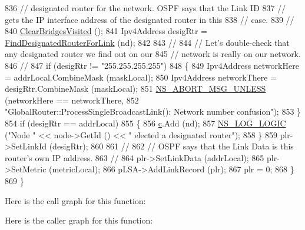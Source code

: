 \begin{DoxyCode}
836       \textcolor{comment}{// designated router for the network.  OSPF says that the Link ID}
837       \textcolor{comment}{// gets the IP interface address of the designated router in this }
838       \textcolor{comment}{// case.}
839       \textcolor{comment}{//}
840       \hyperlink{classns3_1_1GlobalRouter_a2519d9ebeb7425ffe4569c6ed0eaf4cf}{ClearBridgesVisited} ();
841       Ipv4Address desigRtr = \hyperlink{classns3_1_1GlobalRouter_ab562e4407394674ef8502b3ab1d051d6}{FindDesignatedRouterForLink} (nd);
842 
843       \textcolor{comment}{//}
844       \textcolor{comment}{// Let's double-check that any designated router we find out on our}
845       \textcolor{comment}{// network is really on our network.}
846       \textcolor{comment}{//}
847       \textcolor{keywordflow}{if} (desigRtr != \textcolor{stringliteral}{"255.255.255.255"})
848         \{
849           Ipv4Address networkHere = addrLocal.CombineMask (maskLocal);
850           Ipv4Address networkThere = desigRtr.CombineMask (maskLocal);
851           \hyperlink{group__fatal_ga0bd3f62c55e7347ff814572f3aaa3864}{NS\_ABORT\_MSG\_UNLESS} (networkHere == networkThere, 
852                                \textcolor{stringliteral}{"GlobalRouter::ProcessSingleBroadcastLink(): Network number confusion"});
853         \}
854       \textcolor{keywordflow}{if} (desigRtr == addrLocal) 
855         \{
856           \hyperlink{lte_2model_2fading-traces_2fading__trace__generator_8m_ae0323a9039add2978bf5b49550572c7c}{c}.Add (nd);
857           \hyperlink{group__logging_ga88acd260151caf2db9c0fc84997f45ce}{NS\_LOG\_LOGIC} (\textcolor{stringliteral}{"Node "} << node->GetId () << \textcolor{stringliteral}{" elected a designated router"});
858         \}
859       plr->SetLinkId (desigRtr);
860 
861       \textcolor{comment}{//}
862       \textcolor{comment}{// OSPF says that the Link Data is this router's own IP address.}
863       \textcolor{comment}{//}
864       plr->SetLinkData (addrLocal);
865       plr->SetMetric (metricLocal);
866       pLSA->AddLinkRecord (plr);
867       plr = 0;
868     \}
869 \}
\end{DoxyCode}


Here is the call graph for this function\+:




Here is the caller graph for this function\+:


